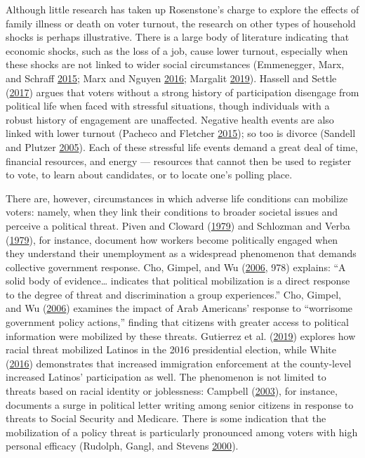 \documentclass[
  12pt,
]{article}
\begin{document}
Although little research has taken up Rosenstone's charge to explore the effects of family illness or death on voter turnout, the research on other types of household shocks is perhaps illustrative. There is a large body of literature indicating that economic shocks, such as the loss of a job, cause lower turnout, especially when these shocks are not linked to wider social circumstances (Emmenegger, Marx, and Schraff \protect\hyperlink{ref-Emmenegger2015}{2015}; Marx and Nguyen \protect\hyperlink{ref-Marx2016}{2016}; Margalit \protect\hyperlink{ref-Margalit2019}{2019}). Hassell and Settle (\protect\hyperlink{ref-Hassell2017}{2017}) argues that voters without a strong history of participation disengage from political life when faced with stressful situations, though individuals with a robust history of engagement are unaffected. Negative health events are also linked with lower turnout (Pacheco and Fletcher \protect\hyperlink{ref-Pacheco2015}{2015}); so too is divorce (Sandell and Plutzer \protect\hyperlink{ref-Sandell2005}{2005}). Each of these stressful life events demand a great deal of time, financial resources, and energy --- resources that cannot then be used to register to vote, to learn about candidates, or to locate one's polling place.

There are, however, circumstances in which adverse life conditions can mobilize voters: namely, when they link their conditions to broader societal issues and perceive a political threat. Piven and Cloward (\protect\hyperlink{ref-Piven1979}{1979}) and Schlozman and Verba (\protect\hyperlink{ref-Schlozman1979}{1979}), for instance, document how workers become politically engaged when they understand their unemployment as a widespread phenomenon that demands collective government response. Cho, Gimpel, and Wu (\protect\hyperlink{ref-Cho2006a}{2006}, 978) explains: ``A solid body of evidence\ldots{} indicates that political mobilization is a direct response to the degree of threat and discrimination a group experiences.'' Cho, Gimpel, and Wu (\protect\hyperlink{ref-Cho2006a}{2006}) examines the impact of Arab Americans' response to ``worrisome government policy actions,'' finding that citizens with greater access to political information were mobilized by these threats. Gutierrez et al. (\protect\hyperlink{ref-Gutierrez2019}{2019}) explores how racial threat mobilized Latinos in the 2016 presidential election, while White (\protect\hyperlink{ref-White2016}{2016}) demonstrates that increased immigration enforcement at the county-level increased Latinos' participation as well. The phenomenon is not limited to threats based on racial identity or joblessness: Campbell (\protect\hyperlink{ref-Campbell2003}{2003}), for instance, documents a surge in political letter writing among senior citizens in response to threats to Social Security and Medicare. There is some indication that the mobilization of a policy threat is particularly pronounced among voters with high personal efficacy (Rudolph, Gangl, and Stevens \protect\hyperlink{ref-Rudolph2000}{2000}).
\end{document}
